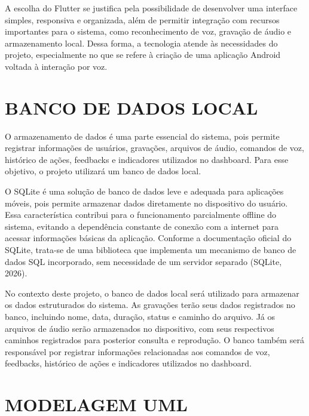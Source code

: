 \documentclass[12pt,oneside,a4paper,brazil,final]{abntex2}
\begin{document}
A escolha do Flutter se justifica pela possibilidade de desenvolver uma interface simples, responsiva e organizada, além de permitir integração com recursos importantes para o sistema, como reconhecimento de voz, gravação de áudio e armazenamento local. Dessa forma, a tecnologia atende às necessidades do projeto, especialmente no que se refere à criação de uma aplicação Android voltada à interação por voz.



\section{BANCO DE DADOS LOCAL}



O armazenamento de dados é uma parte essencial do sistema, pois permite registrar informações de usuários, gravações, arquivos de áudio, comandos de voz, histórico de ações, feedbacks e indicadores utilizados no dashboard. Para esse objetivo, o projeto utilizará um banco de dados local.



O SQLite é uma solução de banco de dados leve e adequada para aplicações móveis, pois permite armazenar dados diretamente no dispositivo do usuário. Essa característica contribui para o funcionamento parcialmente offline do sistema, evitando a dependência constante de conexão com a internet para acessar informações básicas da aplicação. Conforme a documentação oficial do SQLite, trata-se de uma biblioteca que implementa um mecanismo de banco de dados SQL incorporado, sem necessidade de um servidor separado (SQLite, 2026).



No contexto deste projeto, o banco de dados local será utilizado para armazenar os dados estruturados do sistema. As gravações terão seus dados registrados no banco, incluindo nome, data, duração, status e caminho do arquivo. Já os arquivos de áudio serão armazenados no dispositivo, com seus respectivos caminhos registrados para posterior consulta e reprodução. O banco também será responsável por registrar informações relacionadas aos comandos de voz, feedbacks, histórico de ações e indicadores utilizados no dashboard.



\section{MODELAGEM UML}
\end{document}
